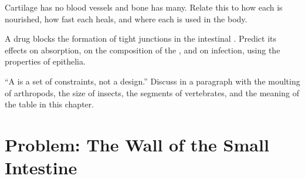 \begin{exercise}[$\star\star\star$]\label{exo:b1:body-plans-tissues:10}
Cartilage has no blood vessels and bone has many. Relate this to how
each is nourished, how fast each heals, and where each is used in the
body.
\end{exercise}

\begin{exercise}[$\star\star\star$]\label{exo:b1:body-plans-tissues:11}
A drug blocks the formation of tight junctions in the intestinal
. Predict its effects on absorption, on the composition of the
, and on infection, using the properties of
epithelia.
\end{exercise}

\begin{exercise}[$\star\star\star$]\label{exo:b1:body-plans-tissues:12}
``A  is a set of constraints, not a design.'' Discuss in a
paragraph with the moulting of arthropods, the size of insects, the
segments of vertebrates, and the meaning of the table in this chapter.
\end{exercise}

\section{Problem: The Wall of the Small Intestine}

